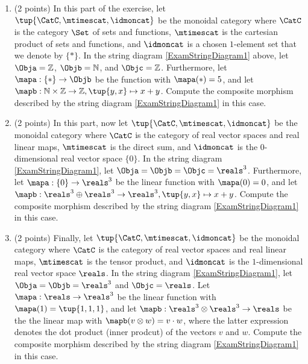 \documentclass[paper=8.125in:10.250in,pagesize=pdftex,
    headinclude=false,footinclude=false,oneside,egregdoesnotlikesansseriftitles]{kaobook}
\begin{document}
\begin{gradedexercise}
\begin{enumerate}
\item (2 points) In this part of the exercise, let $\tup{\CatC,\mtimescat,\idmoncat}$ be the monoidal category where $\CatC$ is the category $\Set$ of sets and functions, $\mtimescat$ is the cartesian product of sets and functions, and $\idmoncat$ is a chosen $1$-element set that we denote by $\{ * \}$. In the string diagram \cref{ExamStringDiagram1} above, let $\Obja = \mathbb{Z}$, $\Objb = \mathbb{N}$, and $\Objc = \mathbb{Z}$. Furthermore, let $\mapa: \{ * \} \rightarrow \Objb$ be the function with $\mapa(*) = 5$, and let $\mapb : \mathbb{N} \times \mathbb{Z} \rightarrow \mathbb{Z}, \tup{y, x} \mapsto x + y$. Compute the composite morphism described by the string diagram \cref{ExamStringDiagram1} in this case. 
\item (2 points) In this part, now let $\tup{\CatC,\mtimescat,\idmoncat}$ be the monoidal category where $\CatC$ is the category of real vector spaces and real linear maps, $\mtimescat$ is the direct sum, and $\idmoncat$ is the $0$-dimensional real vector space $\{ 0 \}$. In the string diagram \cref{ExamStringDiagram1}, let $\Obja = \Objb = \Objc = \reals^3$. Furthermore, let $\mapa: \{ 0 \} \rightarrow \reals^3$ be the linear function with $\mapa(0) = 0$, and let $\mapb : \reals^3 \oplus \reals^3 \rightarrow \reals^3, \tup{y, x} \mapsto x + y$. Compute the composite morphism described by the string diagram \cref{ExamStringDiagram1} in this case. 
\item (2 points) Finally, let $\tup{\CatC,\mtimescat,\idmoncat}$ be the monoidal category where $\CatC$ is the category of real vector spaces and real linear maps, $\mtimescat$ is the tensor product, and $\idmoncat$ is the $1$-dimensional real vector space $\reals$. In the string diagram \cref{ExamStringDiagram1}, let $\Obja = \Objb =  \reals^3$ and $\Objc = \reals$. Let $\mapa: \reals \rightarrow \reals^3$ be the linear function with $\mapa(1) = \tup{1,1,1}$, and let $\mapb : \reals^3 \otimes \reals^3 \rightarrow \reals$ be the the linear map with $\mapb (v \otimes w) = v\cdot w$, where the latter expression denotes the dot product (inner prodcut) of the vectors $v$ and $w$. Compute the composite morphism described by the string diagram \cref{ExamStringDiagram1} in this case.
\end{enumerate}
\end{gradedexercise}


\newpage
\end{document}
